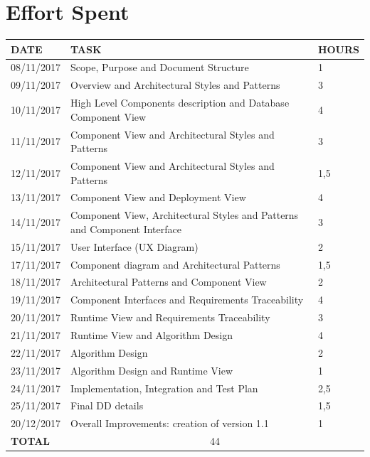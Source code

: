 \documentclass[12pt]{article}
\begin{document}
\section{Effort Spent}

\begin{center}
\begin{tabular}{ |p{}|p{}|p{}| } 
 \hline
 \textbf{DATE} & \textbf{TASK} & \textbf{HOURS} \\ 
  \hline
 08/11/2017 &  Scope, Purpose and Document Structure & 1 \\ 
  \hline
 09/11/2017 & Overview and Architectural Styles and Patterns & 3 \\
  \hline
  10/11/2017 & High Level Components description and Database Component View & 4 \\ 
  \hline
  11/11/2017 & Component View and Architectural Styles and Patterns & 3 \\ 
  \hline
  12/11/2017 & Component View and Architectural Styles and Patterns & 1,5 \\ 
  \hline
  13/11/2017 & Component View and Deployment View & 4 \\ 
  \hline
  14/11/2017 & Component View, Architectural Styles and Patterns and Component Interface & 3 \\ 
  \hline
  15/11/2017 & User Interface (UX Diagram) & 2 \\ 
  \hline
  17/11/2017 & Component diagram and Architectural Patterns & 1,5 \\
  \hline
  18/11/2017 & Architectural Patterns and Component View & 2 \\
  \hline
  19/11/2017 & Component Interfaces and Requirements Traceability & 4 \\
  \hline
  20/11/2017 & Runtime View and Requirements Traceability & 3 \\
  \hline
  21/11/2017 & Runtime View and Algorithm Design & 4 \\
  \hline
  22/11/2017 & Algorithm Design & 2 \\
  \hline
  23/11/2017 & Algorithm Design and Runtime View & 1 \\
  \hline
  24/11/2017 & Implementation, Integration and Test Plan & 2,5 \\
  \hline
  25/11/2017 & Final DD details & 1,5 \\
  \hline
  20/12/2017 & Overall Improvements: creation of version 1.1 & 1 \\ 
  \hline
  \textbf{TOTAL} & \multicolumn{2}{c|}{44} \\ 
  \hline
\end{tabular}
\end{center}
\end{document}
